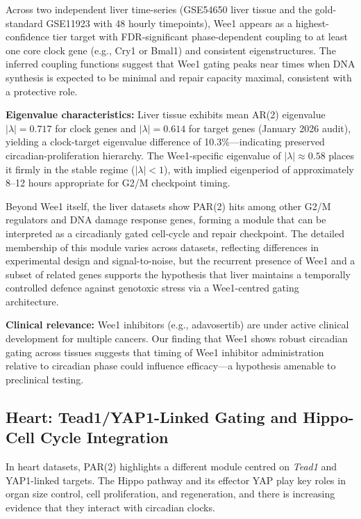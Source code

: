 \documentclass[11pt,a4paper]{article}
\begin{document}
Across two independent liver time-series (GSE54650 liver tissue and the gold-standard GSE11923 with 48 hourly timepoints), Wee1 appears as a highest-confidence tier target with FDR-significant phase-dependent coupling to at least one core clock gene (e.g., Cry1 or Bmal1) and consistent eigenstructures. The inferred coupling functions suggest that Wee1 gating peaks near times when DNA synthesis is expected to be minimal and repair capacity maximal, consistent with a protective role.

\textbf{Eigenvalue characteristics:} Liver tissue exhibits mean AR(2) eigenvalue $|\lambda| = 0.717$ for clock genes and $|\lambda| = 0.614$ for target genes (January 2026 audit), yielding a clock-target eigenvalue difference of 10.3\%---indicating preserved circadian-proliferation hierarchy. The Wee1-specific eigenvalue of $|\lambda| \approx 0.58$ places it firmly in the stable regime ($|\lambda| < 1$), with implied eigenperiod of approximately 8--12 hours appropriate for G2/M checkpoint timing.

Beyond Wee1 itself, the liver datasets show PAR(2) hits among other G2/M regulators and DNA damage response genes, forming a module that can be interpreted as a circadianly gated cell-cycle and repair checkpoint. The detailed membership of this module varies across datasets, reflecting differences in experimental design and signal-to-noise, but the recurrent presence of Wee1 and a subset of related genes supports the hypothesis that liver maintains a temporally controlled defence against genotoxic stress via a Wee1-centred gating architecture.

\textbf{Clinical relevance:} Wee1 inhibitors (e.g., adavosertib) are under active clinical development for multiple cancers. Our finding that Wee1 shows robust circadian gating across tissues suggests that timing of Wee1 inhibitor administration relative to circadian phase could influence efficacy---a hypothesis amenable to preclinical testing.

\subsection{Heart: Tead1/YAP1-Linked Gating and Hippo-Cell Cycle Integration}

In heart datasets, PAR(2) highlights a different module centred on \textit{Tead1} and YAP1-linked targets. The Hippo pathway and its effector YAP play key roles in organ size control, cell proliferation, and regeneration, and there is increasing evidence that they interact with circadian clocks.
\end{document}
